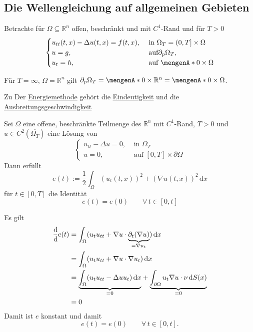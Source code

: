 \subsection{Die Wellengleichung auf allgemeinen Gebieten} 
\label{sub:die_wellengleichung_auf_allgemeinen_gebieten}
Betrachte für $\Omega \subseteq \mathbb{R}^n$ offen, beschränkt und mit $C^1$-Rand und für $T >0$
\[
	\begin{cases}
		u_{tt}(t,x) - \Delta u(t,x) = f(t,x), &\text{ in }\Omega_T = (0,T] \times \Omega\\
		u=g ,&\text{ auf} \partial_p \Omega_T, \\
		u_t=h, &\text{ auf } \set{0} \times \Omega		
	\end{cases}
\]
\begin{bemerkung}
	Für $T= \infty$, $ \Omega = \mathbb{R}^n$ gilt $ \partial _p \Omega_T = \set{0} \times \mathbb{R}^n = \set{0} \times \Omega$.
\end{bemerkung}
Zu Der \underline{Energiemethode} gehört die \underline{Eindeutigkeit} und die \underline{Ausbreitungsgeschwindigkeit} 

\begin{lemma}
	Sei $\Omega$ eine offene, beschränkte Teilmenge des $\mathbb{R}^n$ mit $C^1$-Rand, $T>0$ und $u \in C^2(\overline{\Omega_T})$ eine Lösung von
	\[
		\begin{cases}
			u_{tt}- \Delta u = 0, &\text{ in }\Omega_T\\
			u=0, &\text{ auf }[0,T] \times \partial \Omega
		\end{cases}
	\]
	Dann erfüllt 
	\[
		e(t) := \frac{1}{2} \int_{\Omega}^{} (u_t(t,x))^2 + ( \nabla u(t,x))^2 \,\mathrm{d}x
	\]
	für $t \in [0,T]$ die Identität
	\[
		e(t) = e(0) \qquad \forall\, t \in [0,t]
	\]
\end{lemma}
\begin{beweis}
	Es gilt
	\begin{align*}
		\frac{\mathrm{d}\mkern-1.0mu }{\mathrm{d}\mkern-1.0mu } e(t) &= \int_{\Omega}^{}( u_t u_{tt} +  \nabla u \cdot \underset{=  \nabla u_t}{\underbrace{\partial_t (  \nabla u)}}) \,\mathrm{d}x \\
		&= \int_{\Omega}^{}( u_t u_{tt} +  \nabla u \cdot  \nabla u_t) \,\mathrm{d}x \\ 
		&= \underset{=0}{\underbrace{\int_{\Omega}^{} (u_t u_{tt} - \Delta u u_t) \,\mathrm{d}x}} 
		+ \underset{=0}{\underbrace{ \int_{ \partial \Omega}^{} u_t  \nabla u \cdot \nu \,\mathrm{d}S(x)}} \\
		&=0
	\end{align*}
	Damit ist $e$ konstant und damit
	\[
		e(t) = e(0) \qquad \forall\, t \in [0,t].
	\]
\end{beweis}